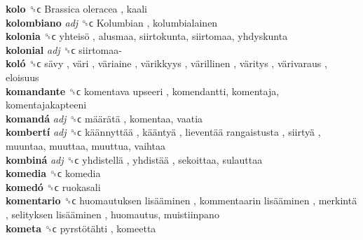 \textbf{kolo} ␝ϲ   Brassica oleracea , kaali  \\
\textbf{kolombiano} \emph{adj}  ␝ϲ   Kolumbian , kolumbialainen  \\
\textbf{kolonia} ␝ϲ   yhteisö , alusmaa, siirtokunta, siirtomaa, yhdyskunta  \\
\textbf{kolonial} \emph{adj}  ␝ϲ   siirtomaa-   \\
\textbf{koló} ␝ϲ   sävy ,  väri ,  väriaine ,  värikkyys ,  värillinen ,  väritys ,  värivaraus , eloisuus  \\
\textbf{komandante} ␝ϲ   komentava upseeri , komendantti, komentaja, komentajakapteeni  \\
\textbf{komandá} \emph{adj}  ␝ϲ   määrätä , komentaa, vaatia  \\
\textbf{kombertí} \emph{adj}  ␝ϲ   käännyttää ,  kääntyä ,  lieventää rangaistusta ,  siirtyä , muuntaa, muuttaa, muuttua, vaihtaa  \\
\textbf{kombiná} \emph{adj}  ␝ϲ   yhdistellä ,  yhdistää , sekoittaa, sulauttaa  \\
\textbf{komedia} ␝ϲ  komedia  \\
\textbf{komedó} ␝ϲ  ruokasali  \\
\textbf{komentario} ␝ϲ   huomautuksen lisääminen ,  kommentaarin lisääminen ,  merkintä ,  selityksen lisääminen , huomautus, muistiinpano  \\
\textbf{kometa} ␝ϲ   pyrstötähti , komeetta  \\

